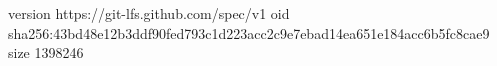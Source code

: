 version https://git-lfs.github.com/spec/v1
oid sha256:43bd48e12b3ddf90fed793c1d223acc2c9e7ebad14ea651e184acc6b5fc8cae9
size 1398246
